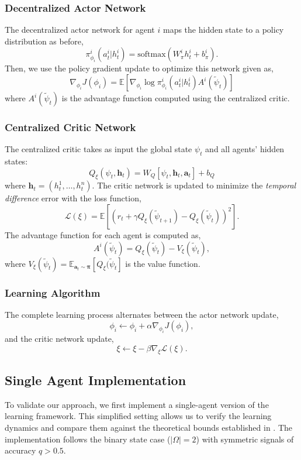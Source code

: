 \subsubsection*{Decentralized Actor Network}
The decentralized actor network for agent $i$ maps the hidden state to a policy distribution as before,
\[
    \pi^i_{\phi_i}(a^i_t|h^i_t) = \text{softmax}(W^i_{\pi}h^i_t + b^i_{\pi}).
\]
Then, we use the policy gradient update to optimize this network given as,
\[
    \nabla_{\phi_i} J(\phi_i) = \mathbb{E}\left[\nabla_{\phi_i} \log \pi^i_{\phi_i}(a^i_t|h^i_t) A^i(\tilde{\psi}_t)\right]
\]
where $A^i(\tilde{\psi}_t)$ is the advantage function computed using the centralized critic.

\subsubsection*{Centralized Critic Network}

The centralized critic takes as input the global state $\psi_t$ and all agents' hidden states:
\[
    Q_{\xi}(\psi_t, \mathbf{h}_t) = W_Q[\psi_t, \mathbf{h}_t, \mathbf{a}_t] + b_Q
\]
where $\mathbf{h}_t = (h^1_t, \ldots, h^n_t)$. The critic network is updated to minimize the \textit{temporal difference} error with the loss function,
\[
    \mathcal{L}(\xi) = \mathbb{E}\left[(r_t + \gamma Q_{\xi}(\tilde{\psi}_{t+1}) - Q_{\xi}(\tilde{\psi}_t))^2\right].
\]
The advantage function for each agent is computed as,
\[
    A^i(\tilde{\psi}_t) = Q_{\xi}(\tilde{\psi}_t) - V_{\xi}(\tilde{\psi}_t),
\]
where $V_{\xi}(\tilde{\psi}_t) = \mathbb{E}_{\mathbf{a}_t \sim \boldsymbol{\pi}}[Q_{\xi}(\tilde{\psi}_t]$ is the value function.


\subsubsection*{Learning Algorithm}
The complete learning process alternates between the actor network update,
\[
    \phi_i \leftarrow \phi_i + \alpha \nabla_{\phi_i} J(\phi_i),
\]
and the critic network update,
\[
    \xi \leftarrow \xi - \beta \nabla_{\xi} \mathcal{L}(\xi).
\]

\subsection*{Single Agent Implementation}

To validate our approach, we first implement a single-agent version of the learning framework. This simplified setting allows us to verify the learning dynamics and compare them against the theoretical bounds established in \cite{brandl2024}. The implementation follows the binary state case ($|\Omega| = 2$) with symmetric signals of accuracy $q > 0.5$.

